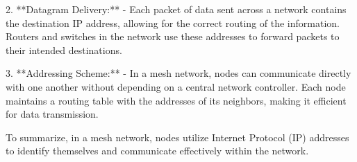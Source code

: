 2. **Datagram Delivery:**
   - Each packet of data sent across a network contains the destination IP address, allowing for the correct routing of the information. Routers and switches in the network use these addresses to forward packets to their intended destinations.

3. **Addressing Scheme:**
   - In a mesh network, nodes can communicate directly with one another without depending on a central network controller. Each node maintains a routing table with the addresses of its neighbors, making it efficient for data transmission.

To summarize, in a mesh network, nodes utilize Internet Protocol (IP) addresses to identify themselves and communicate effectively within the network.


